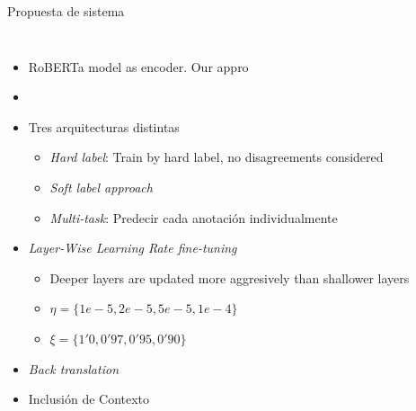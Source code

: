 
\begin{frame}{Propuesta de sistema}
    \begin{columns}
    \begin{itemize}
        \item RoBERTa model as encoder. Our appro
        \item 
        \item Tres arquitecturas distintas
            \begin{itemize}
                \item \textit{Hard label}: Train by hard label, no disagreements considered
                \item \textit{Soft label approach}
                \item \textit{Multi-task}: Predecir cada anotación individualmente
            \end{itemize}

        \item \textit{Layer-Wise Learning Rate fine-tuning}
        \begin{itemize}
            \item Deeper layers are updated more aggresively than shallower layers
            \item $\eta = \{1e-5, 2e-5, 5e-5, 1e-4\}$
            \item $\xi = \{1'0, 0'97, 0'95, 0'90\}$
        \end{itemize}
        \item \textit{Back translation}
        \item Inclusión de Contexto
    \end{itemize}
    
    \centering
    
    \end{columns}
\end{frame}

